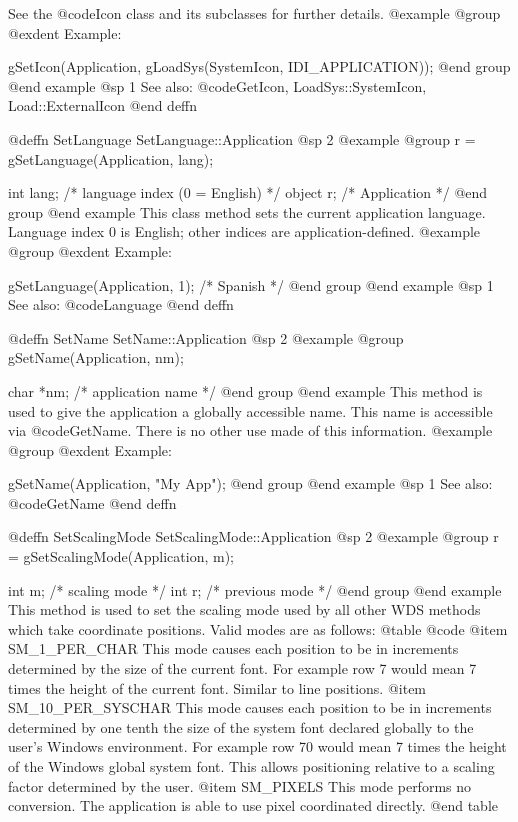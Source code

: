 See the @code{Icon} class and its subclasses for further details.
@example
@group
@exdent Example:

gSetIcon(Application, gLoadSys(SystemIcon, IDI_APPLICATION));
@end group
@end example
@sp 1
See also:  @code{GetIcon, LoadSys::SystemIcon, Load::ExternalIcon}
@end deffn



@deffn {SetLanguage} SetLanguage::Application
@sp 2
@example
@group
r = gSetLanguage(Application, lang);

int     lang;   /*  language index (0 = English)  */
object  r;      /*  Application                   */
@end group
@end example
This class method sets the current application language.  Language
index 0 is English; other indices are application-defined.
@example
@group
@exdent Example:

gSetLanguage(Application, 1);  /* Spanish */
@end group
@end example
@sp 1
See also:  @code{Language}
@end deffn



@deffn {SetName} SetName::Application
@sp 2
@example
@group
gSetName(Application, nm);

char    *nm;    /*  application name  */
@end group
@end example
This method is used to give the application a globally accessible name.
This name is accessible via @code{GetName}.  There is no other use
made of this information.
@example
@group
@exdent Example:

gSetName(Application, "My App");
@end group
@end example
@sp 1
See also:  @code{GetName}
@end deffn



@deffn {SetScalingMode} SetScalingMode::Application
@sp 2
@example
@group
r = gSetScalingMode(Application, m);

int     m;      /*  scaling mode   */
int     r;      /*  previous mode  */
@end group
@end example
This method is used to set the scaling mode used by all other WDS methods
which take coordinate positions.  Valid modes are as follows:
@table @code
@item SM_1_PER_CHAR
This mode causes each position to be in increments determined by the
size of the current font.  For example row 7 would mean 7 times the
height of the current font.  Similar to line positions.
@item SM_10_PER_SYSCHAR
This mode causes each position to be in increments determined by one
tenth the size of the system font declared globally to the user's
Windows environment.  For example row 70 would mean 7 times the height
of the Windows global system font.  This allows positioning relative
to a scaling factor determined by the user.
@item SM_PIXELS
This mode performs no conversion.  The application is able to use
pixel coordinated directly.
@end table

